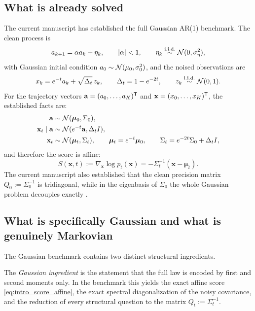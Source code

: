 \documentclass[11pt]{article}
\begin{document}
\subsection{What is already solved}

The current manuscript has established the full Gaussian AR(1) benchmark. The clean process is
\begin{equation}
 a_{k+1}=\alpha a_k+\eta_k,
 \qquad |\alpha|<1,
 \qquad \eta_k\stackrel{\mathrm{i.i.d.}}{\sim}\mathcal{N}(0,\sigma_\eta^2),
\end{equation}
with Gaussian initial condition $a_0\sim\mathcal{N}(\mu_0,\sigma_0^2)$, and the noised observations are
\begin{equation}
 x_k=e^{-t}a_k+\sqrt{\Delta_t}\,z_k,
 \qquad \Delta_t=1-e^{-2t},
 \qquad z_k\stackrel{\mathrm{i.i.d.}}{\sim}\mathcal{N}(0,1).
\end{equation}
For the trajectory vectors $\mathbf a=(a_0,\dots,a_K)^{\mathsf{T}}$ and $\mathbf x=(x_0,\dots,x_K)^{\mathsf{T}}$, the established facts are:
\begin{align}
 \mathbf a &\sim \mathcal{N}(\boldsymbol\mu_0,\Sigma_0), \\
 \mathbf x_t\mid \mathbf a &\sim \mathcal{N}(e^{-t}\mathbf a,\Delta_tI), \\
 \mathbf x_t &\sim \mathcal{N}(\boldsymbol\mu_t,\Sigma_t),
 \qquad \boldsymbol\mu_t=e^{-t}\boldsymbol\mu_0,
 \qquad \Sigma_t=e^{-2t}\Sigma_0+\Delta_tI,
\end{align}
and therefore the score is affine:
\begin{equation}\label{eq:intro_score_affine}
 S(\mathbf x,t):=\nabla_{\mathbf x}\log p_t(\mathbf x)
 =-\Sigma_t^{-1}(\mathbf x-\boldsymbol\mu_t).
\end{equation}
The current manuscript also established that the clean precision matrix $Q_0:=\Sigma_0^{-1}$ is tridiagonal, while in the eigenbasis of $\Sigma_0$ the whole Gaussian problem decouples exactly \cite{draftar1,structure,anatomy,companion}.

\subsection{What is specifically Gaussian and what is genuinely Markovian}

The Gaussian benchmark contains two distinct structural ingredients.

\begin{definition}
The \emph{Gaussian ingredient} is the statement that the full law is encoded by first and second moments only. In the benchmark this yields the exact affine score \eqref{eq:intro_score_affine}, the exact spectral diagonalization of the noisy covariance, and the reduction of every structural question to the matrix $Q_t:=\Sigma_t^{-1}$.
\end{definition}
\end{document}
